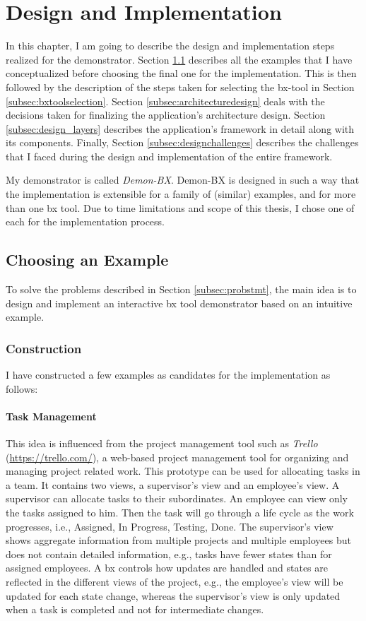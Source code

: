 \section{Design and Implementation}\label{sec:design}
In this chapter, I am going to describe the design and implementation steps realized for the demonstrator. Section \ref{subsec:exampleforimplementation} describes all the examples that I have conceptualized before choosing the final one for the implementation. This is then followed by the description of the steps taken for selecting the bx-tool in Section \ref{subsec:bxtoolselection}. Section \ref{subsec:architecturedesign} deals with the decisions taken for finalizing the application's architecture design. Section \ref{subsec:design_layers} describes the application's framework in detail along with its components. Finally, Section \ref{subsec:designchallenges} describes the challenges that I faced during the design and implementation of the entire framework. 

My demonstrator is called \textit{\ac{Demon-BX}}. Demon-BX is designed in such a way that the implementation is extensible for a family of (similar) examples, and for more than one bx tool. Due to time limitations and scope of this thesis, I chose one of each for the implementation process.

\subsection{Choosing an Example}\label{subsec:exampleforimplementation}
To solve the problems described in Section \ref{subsec:probstmt}, the main idea is to design and implement an interactive bx tool demonstrator based on an intuitive example.

\subsubsection{Construction}\label{subsubsec:exampleconstruction}
I have constructed a few examples as candidates for the implementation as follows:

\paragraph{Task Management} This idea is influenced from the project management tool such as \textit{Trello} (\url{https://trello.com/}), a web-based project management tool for organizing and managing project related work. This prototype can be used for allocating tasks in a team. It contains two views, a supervisor's view and an employee's view. A supervisor can allocate tasks to their subordinates. An employee can view only the tasks assigned to him. Then the task will go through a life cycle as the work progresses, i.e., Assigned, In Progress, Testing, Done. The supervisor's view shows aggregate information from multiple projects and multiple employees but does not contain detailed information, e.g., tasks have fewer states than for assigned employees. A bx controls how updates are handled and states are reflected in the different views of the project, e.g., the employee's view will be updated for each state change, whereas the supervisor's view is only updated when a task is completed and not for intermediate changes.


